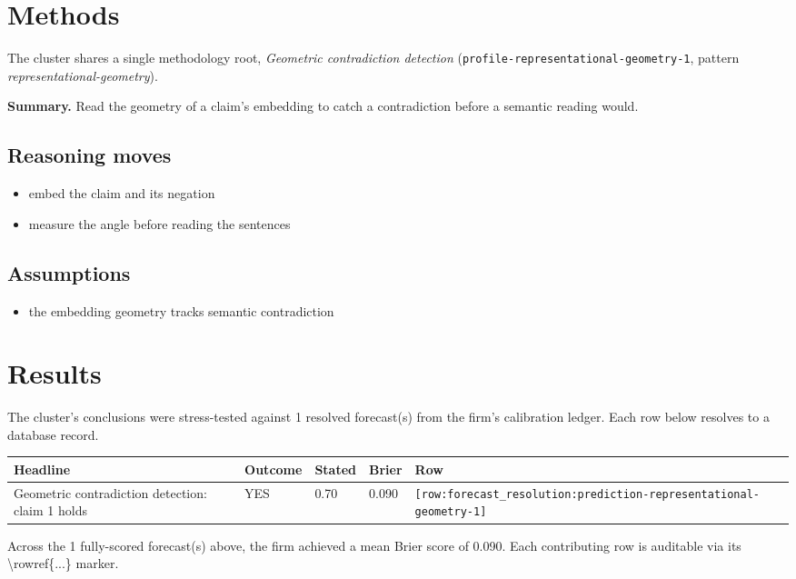 \documentclass[11pt,letterpaper]{article}
\newcommand{\rowref}[1]{\texttt{\small[row:#1]}}
\begin{document}
\section{Methods}
The cluster shares a single methodology root,
\textit{Geometric contradiction detection} (\texttt{profile-representational-geometry-1}, pattern \emph{representational-geometry}).

\textbf{Summary.} Read the geometry of a claim's embedding to catch a contradiction before a semantic reading would.

\subsection*{Reasoning moves}
\begin{itemize}[leftmargin=1.5em]
  \item embed the claim and its negation
  \item measure the angle before reading the sentences
\end{itemize}
\subsection*{Assumptions}
\begin{itemize}[leftmargin=1.5em]
  \item the embedding geometry tracks semantic contradiction
\end{itemize}
\section{Results}
The cluster's conclusions were stress-tested against
1 resolved forecast(s) from the firm's
calibration ledger. Each row below resolves to a database record.

\begin{center}
\begin{tabular}{@{}p{} p{} p{} p{} p{}@{}}
\toprule
\textbf{Headline} & \textbf{Outcome} & \textbf{Stated} & \textbf{Brier} & \textbf{Row} \\
\midrule
Geometric contradiction detection: claim 1 holds & YES & 0.70 & 0.090 & \rowref{forecast\_resolution:prediction-representational-geometry-1} \\
\bottomrule
\end{tabular}
\end{center}

Across the 1 fully-scored forecast(s) above, the firm achieved a mean Brier score of 0.090. Each contributing row is auditable via its \textbackslash{}rowref\{...\} marker.
\end{document}
